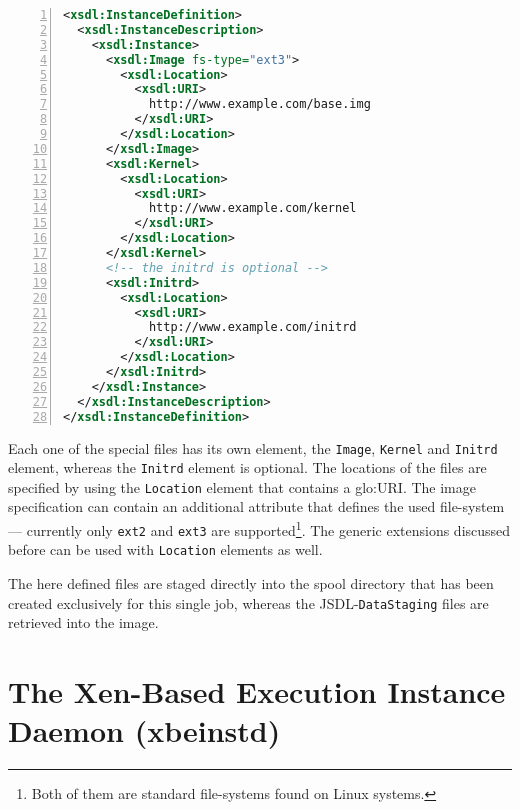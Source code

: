 \bigskip

\begin{center}
  \begin{minipage}{.75\textwidth}
    \begin{lstlisting}[captionpos=b,backgroundcolor=\color{listingcolor},frame=lines,numbers=left,stepnumber=5,numberfirstline=false,numberstyle=\tiny,caption={Example
      of an \texttt{InstanceDefinition} element describing the required
      files of a virtual machine.},label={lst:xbe-xsdl-example},language=XML]
<xsdl:InstanceDefinition>
  <xsdl:InstanceDescription>
    <xsdl:Instance>
      <xsdl:Image fs-type="ext3">
        <xsdl:Location>
          <xsdl:URI>
            http://www.example.com/base.img
          </xsdl:URI>
        </xsdl:Location>
      </xsdl:Image>
      <xsdl:Kernel>
        <xsdl:Location>
          <xsdl:URI>
            http://www.example.com/kernel
          </xsdl:URI>
        </xsdl:Location>
      </xsdl:Kernel>
      <!-- the initrd is optional -->
      <xsdl:Initrd>
        <xsdl:Location>
          <xsdl:URI>
            http://www.example.com/initrd
          </xsdl:URI>
        </xsdl:Location>
      </xsdl:Initrd>
    </xsdl:Instance>
  </xsdl:InstanceDescription>
</xsdl:InstanceDefinition>
    \end{lstlisting}
  \end{minipage}
\end{center}

Each one of the special files has its own element, \ie the \texttt{Image},
\texttt{Kernel} and  \texttt{Initrd} element, whereas  the \texttt{Initrd}
element is optional. The locations of the files are specified by using the
\texttt{Location}  element  that  contains  a  \gls{glo:URI}.   The  image
specification can  contain an additional  attribute that defines  the used
file-system  ---  currently   only  \texttt{ext2}  and  \texttt{ext3}  are
supported\footnote{Both of  them are standard file-systems  found on Linux
  systems.}.   The generic extensions  discussed before  can be  used with
\texttt{Location} elements as well.

The here defined  files are staged directly into  the spool directory that
has   been  created  exclusively   for  this   single  job,   whereas  the
JSDL-\texttt{DataStaging} files are retrieved into the image.

\section[The Xen-Based Execution Instance Daemon]{The Xen-Based Execution Instance Daemon (xbeinstd)}
\label{sec:xbeinstd}

